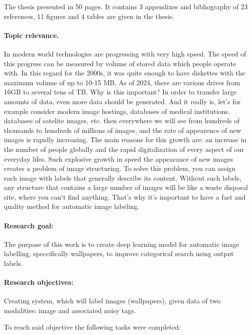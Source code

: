 \documentclass{udstu}
\begin{document}
\abstractEng

The thesis presented in 50 pages.
It contains 3 appendixes and bibliography of 23 references,
11 figures and 4 tables are given in the thesis.

\paragraph{\textbf{Topic relevance.}}
In modern world technologies are progressing with very high speed. The speed of this progress can be
measured by volume of stored data which people operate with. In this regard for the 2000s, it was
quite enough to have diskettes with the maximum volume of up to 10-15 MB. As of 2024, there are various
drives from 16GB to several tens of TB. Why is this important? In order to transfer large amounts of data,
even more data should be generated. And it really is, let's for example consider modern image hostings,
databases of medical institutions, databases of satelite images, etc. then everywhere we will see
from hundreds of thousands to hundreds of millions of images, and the rate of appearence of new images
is rapidly increasing. The main reasons for this growth are: an increase in the number of people globally and
the rapid digitalization of every aspect of our everyday lifes.
Such explosive growth in speed the appearance of new images creates a problem of image structuring.
To solve this problem, you can assign each image with labels that generally describe its content.
Without such labels, any structure that contains a large number of images will be like
a waste disposal site, where you can`t find anything.
That's why it's important to have a fast and quality method for automatic image labeling.

\paragraph{\textbf{Research goal:}}
The purpose of this work is to create deep learning model for automatic image labelling,
speccifically wallpapers, to improve categorical search using output labels.

\paragraph{\textbf{Research objectives:}}
Creating system, which will label images (wallpapers), given data of two modalities:
image and associated noisy tags.

To reach said objective the following tasks were completed:
\end{document}
